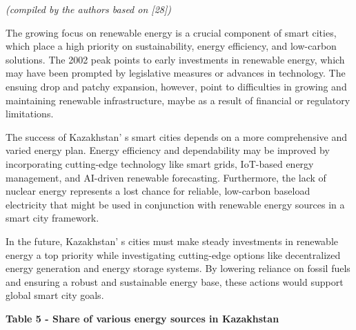 \emph{(compiled by the authors based on {[}28{]})}

The growing focus on renewable energy is a crucial component of smart
cities, which place a high priority on sustainability, energy
efficiency, and low-carbon solutions. The 2002 peak points to early
investments in renewable energy, which may have been prompted by
legislative measures or advances in technology. The ensuing drop and
patchy expansion, however, point to difficulties in growing and
maintaining renewable infrastructure, maybe as a result of financial or
regulatory limitations.

The success of Kazakhstan' s smart cities depends on a
more comprehensive and varied energy plan. Energy efficiency and
dependability may be improved by incorporating cutting-edge technology
like smart grids, IoT-based energy management, and AI-driven renewable
forecasting. Furthermore, the lack of nuclear energy represents a lost
chance for reliable, low-carbon baseload electricity that might be used
in conjunction with renewable energy sources in a smart city framework.

In the future, Kazakhstan' s cities must make steady
investments in renewable energy a top priority while investigating
cutting-edge options like decentralized energy generation and energy
storage systems. By lowering reliance on fossil fuels and ensuring a
robust and sustainable energy base, these actions would support global
smart city goals.

{\bfseries Table 5 - Share of various energy sources in Kazakhstan}

